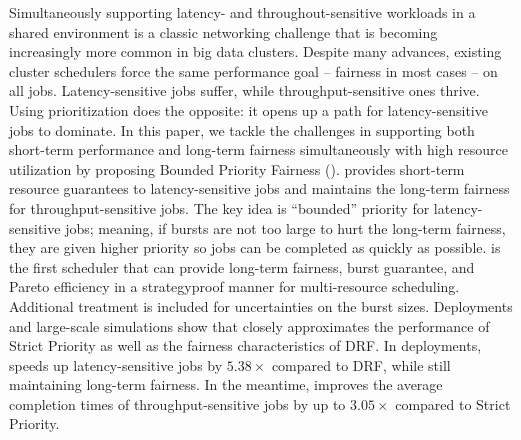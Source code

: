 Simultaneously supporting latency- and throughout-sensitive workloads in a shared environment is a classic networking challenge that is becoming increasingly more common in big data clusters. 
Despite many advances, existing cluster schedulers force the same performance goal -- fairness in most cases -- on all jobs. 
Latency-sensitive jobs suffer, while throughput-sensitive ones thrive. 
Using prioritization does the opposite: it opens up a path for latency-sensitive jobs to dominate. 
In this paper, we tackle the challenges in supporting both short-term performance and long-term fairness simultaneously with high resource utilization by proposing Bounded Priority Fairness (\name). 
\name provides short-term resource guarantees to latency-sensitive jobs and maintains the long-term fairness for throughput-sensitive jobs. 
The key idea is ``bounded'' priority for latency-sensitive jobs; meaning, if bursts are not too large to hurt the long-term fairness, they are given higher priority so jobs can be completed as quickly as possible. \name is the first scheduler that can provide long-term fairness, burst guarantee, and Pareto efficiency in a strategyproof manner for multi-resource scheduling. 
Additional treatment is included for uncertainties on the burst sizes.
Deployments and large-scale simulations show that \name closely approximates the performance of Strict Priority as well as the fairness characteristics of DRF. 
In deployments, \name speeds up latency-sensitive jobs by $5.38\times$ compared to DRF, while still maintaining long-term fairness. 
In the meantime, \name improves the average completion times of throughput-sensitive jobs by up to $3.05\times$ compared to Strict Priority.



